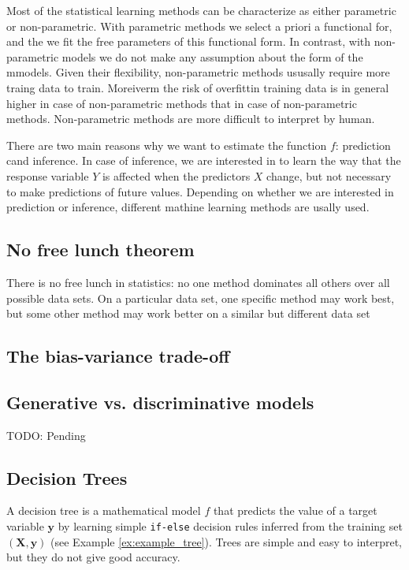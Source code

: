 Most of the statistical learning methods can be characterize as either parametric or non-parametric. With parametric methods we select a priori a functional for, and the we fit the free parameters of this functional form. In contrast, with non-parametric models we do not make any assumption about the form of the mmodels. Given their flexibility, non-parametric methods ususally require more traing data to train. Moreiverm the risk of overfittin training data is in general higher in case of non-parametric methods that in case of non-parametric methods. Non-parametric methods are more difficult to interpret by human.

There are two main reasons why we want to estimate the function $f$: prediction cand inference. In case of inference, we are interested in to learn the way that the response variable $Y$ is affected when the predictors $X$ change, but not necessary to make predictions of future values. Depending on whether we are interested in prediction or inference, different mathine learning methods are usally used.

\subsection{No free lunch theorem}

{\color{red} There is no free lunch in statistics: no one method dominates all others over all possible data sets. On a particular data set, one specific method may work best, but some other method may work better on a similar but different data set}

\subsection{The bias-variance trade-off}


\subsection{Generative vs. discriminative models}

{\color{red} TODO: Pending}


\subsection{Decision Trees}
\label{subsec:learning_decision_trees}

A decision tree is a mathematical model $f$ that predicts the value of a target variable $\mathbf{y}$ by learning simple \texttt{if-else} decision rules inferred from the training set $(\mathbf{X}, \mathbf{y})$ (see Example \ref{ex:example_tree}). Trees are simple and easy to interpret, but they do not give good accuracy. 


